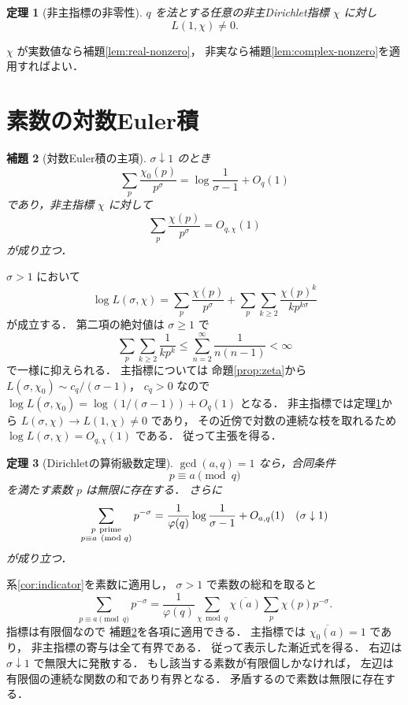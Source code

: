 \documentclass[a5paper,10pt,onecolumn]{jsarticle}
\makeatletter
\theoremstyle{mathnotetheorem}
\newtheorem{theorem}{定理}[section]
\newtheorem{lemma}[theorem]{補題}
\renewcommand{\proofname}{証明}
\renewenvironment{proof}[1][\proofname]{%
  \par\pushQED{\qed}\normalfont\topsep4\p@\@plus2\p@\relax
  \trivlist\item[\hskip\labelsep\bfseries #1]\ignorespaces
}{\popQED\endtrivlist\@endpefalse}
\makeatother
\begin{document}
\begin{theorem}[非主指標の非零性]\label{thm:nonvanishing}
$q$ を法とする任意の非主Dirichlet指標 $\chi$ に対し
\[
 L(1,\chi)\ne0.
\]
\end{theorem}
\begin{proof}
$\chi$ が実数値なら補題\ref{lem:real-nonzero}，
非実なら補題\ref{lem:complex-nonzero}を適用すればよい．
\end{proof}

\section{素数の対数Euler積}

\begin{lemma}[対数Euler積の主項]\label{lem:prime-log}
$\sigma\downarrow1$ のとき
\[
 \sum_p\frac{\chi_0(p)}{p^\sigma}
 =\log\frac1{\sigma-1}+O_q(1)
\]
であり，非主指標 $\chi$ に対して
\[
 \sum_p\frac{\chi(p)}{p^\sigma}=O_{q,\chi}(1)
\]
が成り立つ．
\end{lemma}
\begin{proof}
$\sigma>1$ において
\[
 \log L(\sigma,\chi)
 =\sum_p\frac{\chi(p)}{p^\sigma}
  +\sum_p\sum_{k\ge2}\frac{\chi(p)^k}{k p^{k\sigma}}
\]
が成立する．
第二項の絶対値は $\sigma\ge1$ で
\[
 \sum_p\sum_{k\ge2}\frac1{k p^k}
 \le\sum_{n=2}^\infty\frac1{n(n-1)}
 <\infty
\]
で一様に抑えられる．
主指標については
命題\ref{prop:zeta}から
$L(\sigma,\chi_0)\sim c_q/(\sigma-1)$，
$c_q>0$ なので
$\log L(\sigma,\chi_0)
 =\log(1/(\sigma-1))+O_q(1)$ となる．
非主指標では定理\ref{thm:nonvanishing}から
$L(\sigma,\chi)\to L(1,\chi)\ne0$ であり，
その近傍で対数の連続な枝を取れるため
$\log L(\sigma,\chi)=O_{q,\chi}(1)$ である．
従って主張を得る．
\end{proof}

\begin{theorem}[Dirichletの算術級数定理]\label{thm:dirichlet}
$\gcd(a,q)=1$ なら，合同条件
\[
 p\equiv a\pmod q
\]
を満たす素数 $p$ は無限に存在する．
さらに
\[
 \sum_{\substack{p\ {\rm prime}\\p\equiv a\pmod q}}
 p^{-\sigma}
 =\frac1{\varphi(q)}
 \log\frac1{\sigma-1}+O_{a,q}(1)
 \quad(\sigma\downarrow1)
\]
が成り立つ．
\end{theorem}
\begin{proof}
系\ref{cor:indicator}を素数に適用し，
$\sigma>1$ で素数の総和を取ると
\[
 \sum_{p\equiv a\pmod q}p^{-\sigma}
 =\frac1{\varphi(q)}
 \sum_{\chi\bmod q}\overline{\chi(a)}
 \sum_p\chi(p)p^{-\sigma}.
\]
指標は有限個なので
補題\ref{lem:prime-log}を各項に適用できる．
主指標では $\overline{\chi_0(a)}=1$ であり，
非主指標の寄与は全て有界である．
従って表示した漸近式を得る．
右辺は $\sigma\downarrow1$ で無限大に発散する．
もし該当する素数が有限個しかなければ，
左辺は有限個の連続な関数の和であり有界となる．
矛盾するので素数は無限に存在する．
\end{proof}
\end{document}
